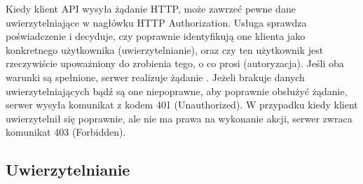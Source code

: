 	Kiedy klient API wysyła żądanie HTTP, może zawrzeć pewne dane uwierzytelniające w nagłówku HTTP Authorization. Usługa sprawdza poświadczenie i decyduje, czy poprawnie identyfikują one klienta jako konkretnego użytkownika (uwierzytelnianie), oraz czy ten użytkownik jest rzeczywiście upoważniony do zrobienia tego, o co prosi (autoryzacja). Jeśli oba warunki są spełnione, serwer realizuje żądanie \cite{RESTfulWebServices}. Jeżeli brakuje danych uwierzytelniających bądź są one niepoprawne, aby poprawnie obsłużyć żądanie, serwer wysyła komunikat z kodem 401 (Unauthorized). W przypadku kiedy klient uwierzytelnił się poprawnie, ale nie ma prawa na wykonanie akcji, serwer zwraca komunikat 403 (Forbidden).
	
	\subsection{Uwierzytelnianie}
		 
